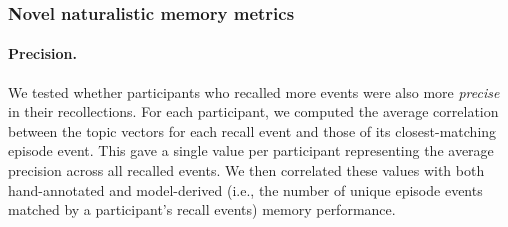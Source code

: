 \documentclass{article}
\begin{document}


\subsubsection*{Novel naturalistic memory metrics}

\paragraph*{Precision.}
We tested whether participants who recalled more events were also more \textit{precise} in their recollections. For each participant, we computed the average correlation between the topic vectors for each recall event and those of its closest-matching episode event. This gave a single value per participant representing the average precision across all recalled events.  We then correlated these values with both hand-annotated and model-derived (i.e., the number of unique episode events matched by a participant's recall events) memory performance.
\end{document}
